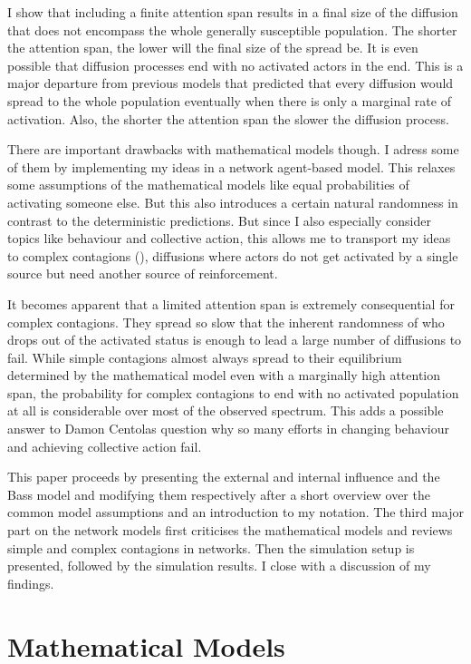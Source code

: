 \documentclass[a4paper,12pt]{article}
\begin{document}
I show that including a finite attention span results in a final size of the diffusion that does not encompass the whole generally susceptible population. The shorter the attention span, the lower will the final size of the spread be. It is even possible that diffusion processes end with no activated actors in the end. This is a major departure from previous models that predicted that every diffusion would spread to the whole population eventually when there is only a marginal rate of activation. Also, the shorter the attention span the slower the diffusion process.

There are important drawbacks with mathematical models though. I adress some of them by implementing my ideas in a network agent-based model. This relaxes some assumptions of the mathematical models like equal probabilities of activating someone else. But this also introduces a certain natural randomness in contrast to the deterministic predictions. But since I also especially consider topics like behaviour and collective action, this allows me to transport my ideas to complex contagions (\cite{centolaHowBehaviorSpreads2018}), diffusions where actors do not get activated by a single source but need another source of reinforcement.

It becomes apparent that a limited attention span is extremely consequential for complex contagions. They spread so slow that the inherent randomness of who drops out of the activated status is enough to lead a large number of diffusions to fail. While simple contagions almost always spread to their equilibrium determined by the mathematical model even with a marginally high attention span, the probability for complex contagions to end with no activated population at all is considerable over most of the observed spectrum. This adds a possible answer to Damon Centolas question why so many efforts in changing behaviour and achieving collective action fail.

This paper proceeds by presenting the external and internal influence and the Bass model and modifying them respectively after a short overview over the common model assumptions and an introduction to my notation. The third major part on the network models first criticises the mathematical models and reviews simple and complex contagions in networks. Then the simulation setup is presented, followed by the simulation results. I close with a discussion of my findings.


\section{Mathematical Models}
\end{document}
